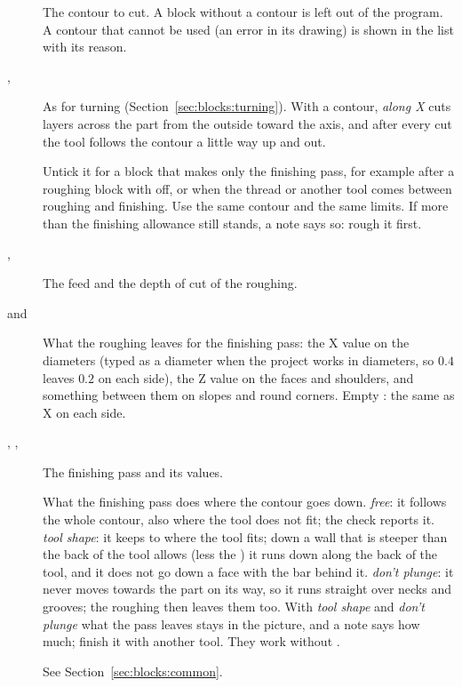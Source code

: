 \begin{description}
\item[] The contour to cut. A block without a contour is left out of the program. A contour that cannot be used (an error in its drawing) is shown in the list with its reason.
\item[, ] As for turning (Section~\ref{sec:blocks:turning}). With a contour, \emph{along X} cuts layers across the part from the outside toward the axis, and after every cut the tool follows the contour a little way up and out.
\item[] Untick it for a block that makes only the finishing pass, for example after a roughing block with  off, or when the thread or another tool comes between roughing and finishing. Use the same contour and the same limits. If more than the finishing allowance still stands, a note says so: rough it first.
\item[, ] The feed and the depth of cut of the roughing.
\item[ and ] What the roughing leaves for the finishing pass: the X value on the diameters (typed as a diameter when the project works in diameters, so $0.4$ leaves $0.2$ on each side), the Z value on the faces and shoulders, and something between them on slopes and round corners. Empty : the same as X on each side.
\item[, , ] The finishing pass and its values.
\item[] What the finishing pass does where the contour goes down. \emph{free}: it follows the whole contour, also where the tool does not fit; the check reports it. \emph{tool shape}: it keeps to where the tool fits; down a wall that is steeper than the back of the tool allows (less the ) it runs down along the back of the tool, and it does not go down a face with the bar behind it. \emph{don't plunge}: it never moves towards the part on its way, so it runs straight over necks and grooves; the roughing then leaves them too. With \emph{tool shape} and \emph{don't plunge} what the pass leaves stays in the picture, and a note says how much; finish it with another tool. They work without .
\item[] See Section~\ref{sec:blocks:common}.

\end{description}
